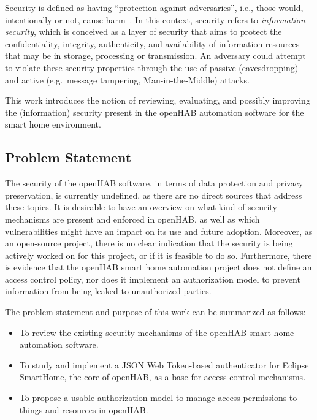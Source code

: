 \documentclass[12pt]{article}
\begin{document}
Security is defined as having ``protection against adversaries'', i.e., those would, intentionally or not, cause harm~\cite{whitman2011principles}. In this context, security refers to \emph{information security}, which is conceived as a layer of security that aims to protect the confidentiality, integrity, authenticity, and availability of information resources that may be in storage, processing or transmission. An adversary could attempt to violate these security properties through the use of passive (eavesdropping) and active (e.g.\ message tampering, Man-in-the-Middle) attacks.

This work introduces the notion of reviewing, evaluating, and possibly improving the (information) security present in the openHAB automation software for the smart home environment. 

\subsection{Problem Statement}

The security of the openHAB software, in terms of data protection and privacy preservation, is currently undefined, as there are no direct sources that address these topics. It is desirable to have an overview on what kind of security mechanisms are present and enforced in openHAB, as well as which vulnerabilities might have an impact on its use and future adoption. Moreover, as an open-source project, there is no clear indication that the security is being actively worked on for this project, or if it is feasible to do so. Furthermore, there is evidence that the openHAB smart home automation project does not define an access control policy, nor does it implement an authorization model to prevent information from being leaked to unauthorized parties.

\noindent The problem statement and purpose of this work can be summarized as follows:
\begin{itemize}
\item To review the existing security mechanisms of the openHAB smart home automation software.
\item To study and implement a JSON Web Token-based authenticator for Eclipse SmartHome, the core of openHAB, as a base for access control mechanisms.
\item To propose a usable authorization model to manage access permissions to things and resources in openHAB. 
\end{itemize}
\end{document}
